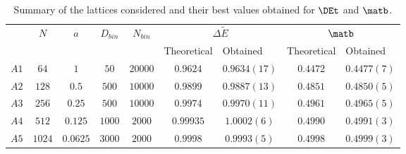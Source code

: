\begin{table}[h!]
  \centering
\begin{tabular}{ccccccccc}
\hline
\multirow{2}{*}{} & \multirow{2}{*}{$N$} & \multirow{2}{*}{$a$} & \multirow{2}{*}{$D_{bin}$} & \multirow{2}{*}{$N_{bin}$} & \multicolumn{2}{c}{$\Delta\tilde{E}$}                            & \multicolumn{2}{c}{$\matb$}                                      \\ \cline{6-9}
           &       &                      &                            &                            & \multicolumn{1}{l}{Theoretical} & \multicolumn{1}{l}{Obtained} & \multicolumn{1}{l}{Theoretical} & \multicolumn{1}{l}{Obtained} \\ \hline
$A1$       &   $64$    & $1$                  & $50$                       & $20000$                    & $0.9624$                          & $0.9634(17)$                    & $0.4472$                         & $0.4477(7)$                   \\
$A2$       &   $128$   & $0.5$                & $500$                      & $10000$                    & $0.9899$                          & $0.9887(13)$                    & $0.4851$                         & $0.4850(5)$                   \\
$A3$       &   $256$    & $0.25$               & $500$                      & $10000$                    & $0.9974$                          & $0.9970(11)$                    & $0.4961$                         & $0.4965(5)$                   \\
$A4$       &   $512$    & $0.125$              & $1000$                     & $2000$                     & $0.99935$                          & $1.0002(6)$                    & $0.4990$                         & $0.4991(3)$                   \\
$A5$      &    $1024$    & $0.0625$             & $3000$                     & $2000$                      & $0.9998$                           & $0.9993(5)$                    & $0.4998$                         & $0.4999(3)$                  \\ \hline
\end{tabular}
\caption{\label{tab:bestvals}Summary of the lattices considered and their best values obtained for $\DEt$ and $\matb$.}
\end{table}
\twocolumn
